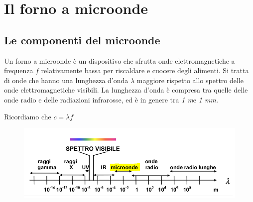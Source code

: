 \documentclass{article}
\begin{document}
\section{Il forno a microonde}
\subsection{Le componenti del microonde}


Un forno a microonde è un dispositivo che sfrutta onde elettromagnetiche a frequenza $f$ relativamente bassa per riscaldare e cuocere degli alimenti. Si tratta di onde che hanno una lunghezza d’onda $\lambda$ maggiore rispetto allo spettro delle onde elettromagnetiche visibili. La lunghezza d’onda è compresa tra quelle delle onde radio e delle radiazioni infrarosse, ed è in genere tra \textit{1 m}e \textit{1 mm.}

Ricordiamo che $c = \lambda f $

\begin{figure}[h]
\centering
\includegraphics[scale=0.6]{1.PNG}
\label{fig: cubed graph}
\end{figure}
\end{document}
